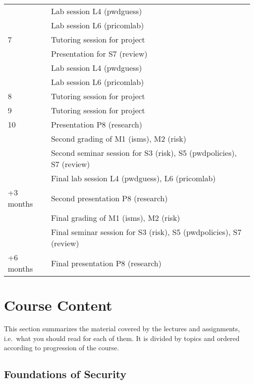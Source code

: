 \begin{table}
\begin{tabular}{lp{9cm}}
      & Lab session L4 (pwdguess)\\
      & Lab session L6 (pricomlab)\\
    \midrule
    7
      & Tutoring session for project\\
      & Presentation for S7 (review)\\
      & Lab session L4 (pwdguess)\\
      & Lab session L6 (pricomlab)\\
    \midrule
    8
      & Tutoring session for project\\
    \midrule
    9
      & Tutoring session for project\\
    \midrule
    10
      & Presentation P8 (research)\\
      & Second grading of M1 (isms), M2 (risk)\\
      & Second seminar session for S3 (risk), S5 (pwdpolicies), S7 (review)\\
      & Final lab session L4 (pwdguess), L6 (pricomlab)\\
    \midrule
    +3 months
      & Second presentation P8 (research)\\
      & Final grading of M1 (isms), M2 (risk)\\
      & Final seminar session for S3 (risk), S5 (pwdpolicies), S7 (review)\\
    \midrule
    +6 months
      & Final presentation P8 (research)\\
    \bottomrule
  \end{tabular}
\end{table}


\section{Course Content}

This section summarizes the material covered by the lectures and assignments, 
i.e.~what you should read for each of them.
It is divided by topics and ordered according to progression of the course.

\subsection{Foundations of Security}


%
%
